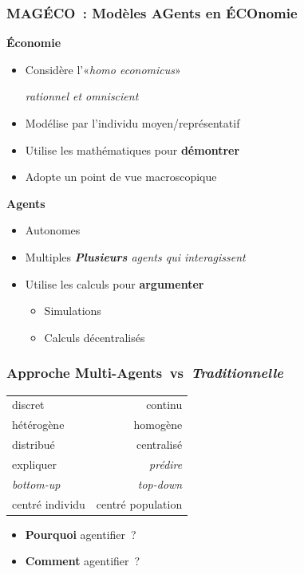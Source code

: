 \documentclass{beamer}
\begin{document}
\begin{frame}
  \frametitle{MAGÉCO~: Modèles AGents en ÉCOnomie}

  \textbf{Économie}
  \begin{itemize}
  \item Considère l'«\emph{homo economicus}»\par
    \hfill {\small\slshape rationnel et omniscient}
  \item Modélise par l'individu moyen/représentatif
  \item Utilise les mathématiques pour \textbf{démontrer}
  \item Adopte un point de vue macroscopique
  \end{itemize}

  \vfill

  \textbf{Agents}
  \begin{itemize}
  \item Autonomes
  \item Multiples
    \hfill{\small\slshape \textbf{Plusieurs} agents qui interagissent}
  \item Utilise les calculs pour \textbf{argumenter}
    \small
    \begin{itemize}
    \item Simulations 
    \item Calculs décentralisés 
    \end{itemize}
  \end{itemize}
\end{frame}


\begin{frame}
  \frametitle{Approche Multi-Agents~vs~\emph{Traditionnelle}}

  \renewcommand{\arraystretch}{2}

  \begin{center}
    \begin{tabular}{l!{\qquad{}\emph{vs}\qquad}r}
      discret & continu \\
      hétérogène & homogène \\
      distribué & centralisé \\
      expliquer & \emph{prédire} \\
      \emph{bottom-up} & \emph{top-down} \\
      centré individu & centré population
    \end{tabular}
  \end{center}
\pause
  \begin{itemize}
  \item \textbf{Pourquoi} agentifier~?
  \item \textbf{Comment} agentifier~?
  \end{itemize}
\end{frame}
\end{document}

